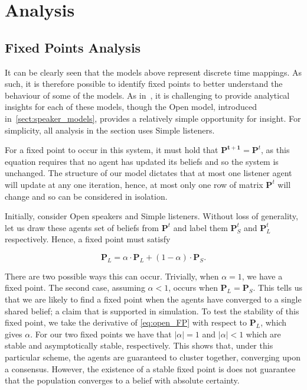 \section{Analysis}\label{sect:analysis}

\subsection{Fixed Points Analysis} \label{sect:fixed_point_analysis}

It can be clearly seen that the models above represent discrete time mappings. As such, it is therefore possible to identify fixed points to better understand the behaviour of some of the models. As in~\cite{Hegselmann2002Opinion}, it is challenging to provide analytical insights for each of these models, though the Open model, introduced in~\cref{sect:speaker_models}, provides a relatively simple opportunity for insight. For simplicity, all analysis in the section uses Simple listeners.  


For a fixed point to occur in this system, it must hold that $\mathbf{P^{t+1}} = \mathbf{P}^t$, as this equation requires that no agent has updated its beliefs and so the system is unchanged. The structure of our model dictates that at most one listener agent will update at any one iteration, hence, at most only one row of matrix $\mathbf{P}^t$ will change and so can be considered in isolation. 

Initially, consider Open speakers and Simple listeners. Without loss of generality, let us draw these agents set of beliefs from $\mathbf{P}^t$ and label them $\mathbf{P}^t_S$ and $\mathbf{P}^t_L$ respectively. Hence, a fixed point must satisfy

\begin{equation}
    \mathbf{P}_L = \alpha \cdot \mathbf{P}_L + (1 - \alpha) \cdot \mathbf{P}_S. \label{eq:open_FP}
\end{equation}

There are two possible ways this can occur. Trivially, when $\alpha = 1$, we have a fixed point. The second case, assuming $\alpha < 1$, occurs when $\mathbf{P}_L=\mathbf{P}_S$. This tells us that we are likely to find a fixed point when the agents have converged to a single shared belief; a claim that is supported in simulation. To test the stability of this fixed point, we take the derivative of \cref{eq:open_FP} with respect to $\mathbf{P}_L$, which gives $\alpha$. For our two fixed points we have that $|\alpha| =  1$ and $|\alpha| < 1$ which are stable and asymptotically stable, respectively. This shows that, under this particular scheme, the agents are guaranteed to cluster together, converging upon a consensus. However, the existence of a stable fixed point is does not guarantee that the population converges to a belief with absolute certainty. 

